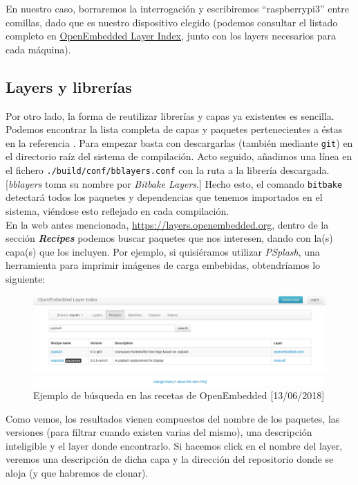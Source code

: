 En nuestro caso, borraremos la interrogación y escribiremos ``raspberrypi3'' entre comillas, dado que es nuestro dispositivo elegido (podemos consultar el listado completo en \href{http://layers.openembedded.org/layerindex/branch/master/machines/?q=&browse=1}{OpenEmbedded Layer Index}, junto con los layers necesarios para cada máquina).\\

\subsection{Layers y librerías}

Por otro lado, la forma de reutilizar librerías y capas ya existentes es sencilla. Podemos encontrar la lista completa de capas y paquetes pertenecientes a éstas en la referencia \cite{yocto-layers-list}. Para empezar basta con descargarlas (también mediante \texttt{git}) en el directorio raíz del sistema de compilación. Acto seguido, añadimos una línea en el fichero \texttt{./build/conf/bblayers.conf} con la ruta a la librería descargada. [\textit{bblayers} toma su nombre por \textit{Bitbake Layers}.] Hecho esto, el comando \texttt{bitbake} detectará todos los paquetes y dependencias que tenemos importados en el sistema, viéndose esto reflejado en cada compilación.\\

En la web antes mencionada, \url{https://layers.openembedded.org}, dentro de la sección \textbf{\textit{Recipes}} podemos buscar paquetes que nos interesen, dando con la(s) capa(s) que los incluyen. Por ejemplo, si quisiéramos utilizar \textit{PSplash}, una herramienta para imprimir imágenes de carga embebidas, obtendríamos lo siguiente:

\begin{figure}[H]
	\centering
	\includegraphics[width=\linewidth]{imagenes/yocto-recipe-search-example.png}
	\caption{Ejemplo de búsqueda en las recetas de OpenEmbedded [13/06/2018]}
	\label{yocto-recipe-search-example}
\end{figure}

Como vemos, los resultados vienen compuestos del nombre de los paquetes, las versiones (para filtrar cuando existen varias del mismo), una descripción inteligible y el layer donde encontrarlo. Si hacemos click en el nombre del layer, veremos una descripción de dicha capa y la dirección del repositorio donde se aloja (y que habremos de clonar).\\

